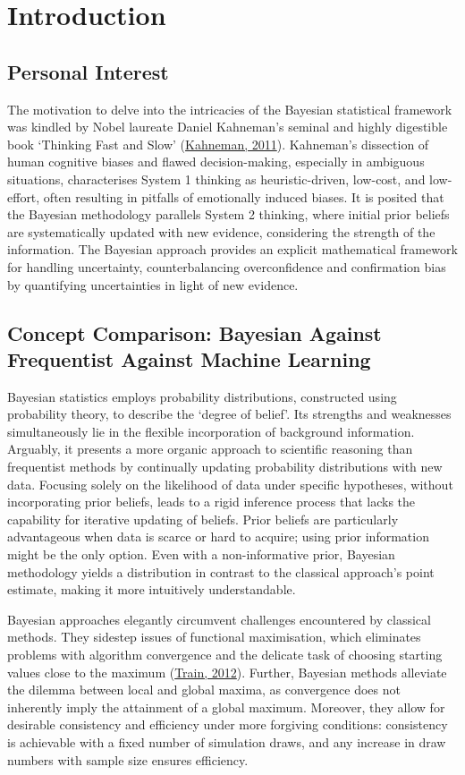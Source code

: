 \documentclass[
  11pt,
]{article}
\begin{document}
\section{Introduction}
  \subsection{Personal Interest}

The motivation to delve into the intricacies of the Bayesian statistical
framework was kindled by Nobel laureate Daniel Kahneman's seminal and
highly digestible book `Thinking Fast and Slow'
(\protect\hyperlink{ref-Kahneman2011}{Kahneman, 2011}). Kahneman's
dissection of human cognitive biases and flawed decision-making,
especially in ambiguous situations, characterises System 1 thinking as
heuristic-driven, low-cost, and low-effort, often resulting in pitfalls
of emotionally induced biases. It is posited that the Bayesian
methodology parallels System 2 thinking, where initial prior beliefs are
systematically updated with new evidence, considering the strength of
the information. The Bayesian approach provides an explicit mathematical
framework for handling uncertainty, counterbalancing overconfidence and
confirmation bias by quantifying uncertainties in light of new evidence.

\subsection{Concept Comparison: Bayesian Against Frequentist Against Machine Learning}

Bayesian statistics employs probability distributions, constructed using
probability theory, to describe the `degree of belief'. Its strengths
and weaknesses simultaneously lie in the flexible incorporation of
background information. Arguably, it presents a more organic approach to
scientific reasoning than frequentist methods by continually updating
probability distributions with new data. Focusing solely on the
likelihood of data under specific hypotheses, without incorporating
prior beliefs, leads to a rigid inference process that lacks the
capability for iterative updating of beliefs. Prior beliefs are
particularly advantageous when data is scarce or hard to acquire; using
prior information might be the only option. Even with a non-informative
prior, Bayesian methodology yields a distribution in contrast to the
classical approach's point estimate, making it more intuitively
understandable.

Bayesian approaches elegantly circumvent challenges encountered by
classical methods. They sidestep issues of functional maximisation,
which eliminates problems with algorithm convergence and the delicate
task of choosing starting values close to the maximum
(\protect\hyperlink{ref-Train2012}{Train, 2012}). Further, Bayesian
methods alleviate the dilemma between local and global maxima, as
convergence does not inherently imply the attainment of a global
maximum. Moreover, they allow for desirable consistency and efficiency
under more forgiving conditions: consistency is achievable with a fixed
number of simulation draws, and any increase in draw numbers with sample
size ensures efficiency.
\end{document}

